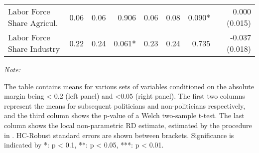 \begin{table}[!h]
\begin{threeparttable}
\begin{tabular}[t]{lrrrrrrr}
\hspace{1em}Labor Force Share Agricul. & \num{0.06} & \num{0.06} & 0.906 & \num{0.06} & \num{0.08} & 0.090* & 0.000 (0.015)\\
\hspace{1em}Labor Force Share Industry & \num{0.22} & \num{0.24} & 0.061* & \num{0.23} & \num{0.24} & 0.735 & -0.037 (0.018)\\
\bottomrule
\end{tabular}
\begin{tablenotes}[para]
\item \textit{Note: } 
\item The table contains means for various sets of variables conditioned on the absolute margin being < 0.2 (left panel) and <0.05 (right panel). The first two columns represent the means for subsequent politicians and non-politicians respectively, and the third column shows the p-value of a Welch two-sample t-test. The last column shows the local non-parametric RD estimate, estimated by the procedure in \cite{cattaneo2019practical}. HC-Robust standard errors are shown between brackets. Significance is indicated by *: p < 0.1, **: p < 0.05, ***: p < 0.01.
\end{tablenotes}
\end{threeparttable}
\end{table}
